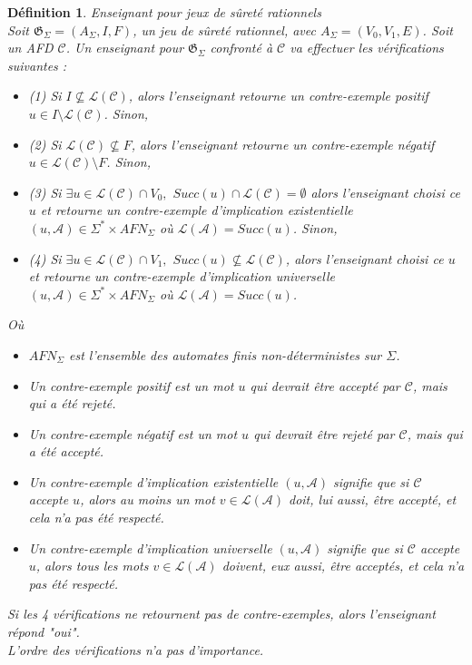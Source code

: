 \documentclass[12pt,a4paper,oneside,titlepage]{report}
\newtheorem{defi}{D\'efinition}[section]
\begin{document}
\begin{defi}{Enseignant pour jeux de sûreté rationnels\\}
Soit $\mathfrak{G}_\Sigma=(A_\Sigma, I, F)$, un jeu de sûreté rationnel, avec $A_\Sigma=(V_0,V_1,E)$. Soit un AFD $\mathcal{C}$. Un enseignant pour $\mathfrak{G}_\Sigma$ confronté à $\mathcal{C}$ va effectuer les vérifications suivantes :\\
\begin{itemize}
\item (1) Si $I\nsubseteq \mathcal{L}(\mathcal{C})$, alors l'enseignant retourne un \emph{contre-exemple positif} $u\in I\setminus \mathcal{L}(\mathcal{C})$. Sinon,
\item (2) Si $\mathcal{L}(\mathcal{C}) \nsubseteq F$, alors l'enseignant retourne un \emph{contre-exemple négatif} $u\in \mathcal{L}(\mathcal{C})\setminus F$. Sinon, 
\item (3) Si $\exists u\in \mathcal{L}(\mathcal{C})\cap V_0,$ $Succ(u)\cap \mathcal{L}(\mathcal{C})=\emptyset$ alors l'enseignant choisi ce $u$ et retourne un \emph{contre-exemple d'implication existentielle} $(u, \mathcal{A})\in \Sigma^* \times AFN_\Sigma$ où $\mathcal{L}(\mathcal{A})=Succ(u)$. Sinon, 
\item (4) Si $\exists u\in \mathcal{L}(\mathcal{C})\cap V_1,$ $Succ(u)\nsubseteq \mathcal{L}(\mathcal{C})$, alors l'enseignant choisi ce $u$ et retourne un \emph{contre-exemple d'implication universelle} $(u, \mathcal{A})\in \Sigma^* \times AFN_\Sigma$ où $\mathcal{L}(\mathcal{A})=Succ(u)$.
\end{itemize}
Où 
\begin{itemize}
\item $AFN_\Sigma$ est l'ensemble des automates finis non-déterministes sur $\Sigma$.
\item Un \emph{contre-exemple positif} est un mot $u$ qui devrait être accepté par $\mathcal{C}$, mais qui a été rejeté.
\item Un \emph{contre-exemple négatif} est un mot $u$ qui devrait être rejeté par $\mathcal{C}$, mais qui a été accepté.
\item Un \emph{contre-exemple d'implication existentielle} $(u, \mathcal{A})$ signifie que si $\mathcal{C}$ accepte $u$, alors au moins un mot $v \in \mathcal{L}(\mathcal{A})$ doit, lui aussi, être accepté, et cela n'a pas été respecté.
\item Un \emph{contre-exemple d'implication universelle} $(u, \mathcal{A})$ signifie que si $\mathcal{C}$ accepte $u$, alors tous les mots $v \in \mathcal{L}(\mathcal{A})$ doivent, eux aussi, être acceptés, et cela n'a pas été respecté.\\
\end{itemize}

\noindent Si les 4 vérifications ne retournent pas de contre-exemples, alors l'enseignant répond "\emph{oui}".\\
L'ordre des vérifications n'a pas d'importance.
\end{defi}
\end{document}
